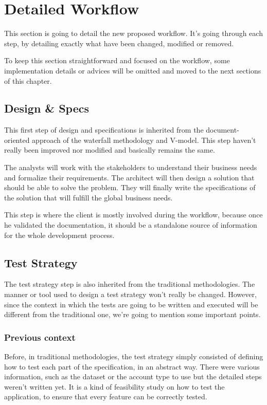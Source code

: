 \section{Detailed Workflow}\label{sec:detailed-workflow}

This section is going to detail the new proposed workflow.
It's going through each step, by detailing exactly what have been changed,
modified or removed.

To keep this section straightforward and focused on the workflow, some
implementation details or advices will be omitted and moved to the next
sections of this chapter.

\subsection{Design \& Specs}\label{subsec:design-specs}
This first step of design and specifications is inherited from the
document-oriented approach of the waterfall methodology and V-model.
This step haven't really been improved nor modified and basically remains the
same.

The analysts will work with the stakeholders to understand their business
needs and formalize their requirements.
The architect will then design a solution that should be able to solve the
problem.
They will finally write the specifications of the solution that will fulfill
the global business needs.

This step is where the client is mostly involved during the workflow, because
once he validated the documentation, it should be a standalone source of
information for the whole development process.


\subsection{Test Strategy}\label{subsec:test-strategy}
The test strategy step is also inherited from the traditional methodologies.
The manner or tool used to design a test strategy won't really be changed.
However, since the context in which the tests are going to be written and
executed will be different from the traditional one, we're going to mention
some important points.

\subsubsection{Previous context}
Before, in traditional methodologies, the test strategy simply consisted of
defining how to test each part of the specification, in an abstract way.
There were various information, such as the dataset or the account type to use
but the detailed steps weren't written yet.
It is a kind of feasibility study on how to test the application, to ensure
that every feature can be correctly tested.

